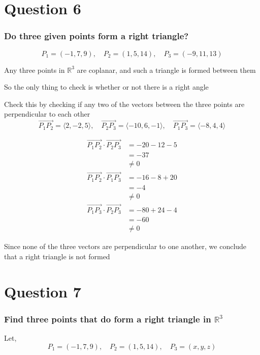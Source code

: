 \documentclass{article}
\begin{document}
\section*{Question 6}
\subsubsection*{Do three given points form a right triangle?}
\[
P_1 = (-1,7,9), \quad P_2 = (1,5,14),  \quad P_3 = (-9,11,13)
\]

Any three points in \(\mathbb{R}^3\) are coplanar, and such a triangle is formed between them

So the only thing to check is whether or not there is a right angle

Check this by checking if any two of the vectors between the three points are perpendicular to each other
\[
\overrightarrow{P_1P_2} = \langle 2,-2,5 \rangle, \quad \overrightarrow{P_2P_3} = \langle -10,6,-1 \rangle, 
\quad \overrightarrow{P_1P_3} = \langle -8,4,4 \rangle
\]

\begin{align*}
    \overrightarrow{P_1P_2} \cdot \overrightarrow{P_2P_3} &= -20-12-5 \\
    &= -37 \\
    &\neq 0
\end{align*}
\begin{align*}
    \overrightarrow{P_1P_2} \cdot \overrightarrow{P_1P_3} &= -16-8+20 \\
    &= -4 \\
    &\neq 0
\end{align*}
\begin{align*}
    \overrightarrow{P_1P_3} \cdot \overrightarrow{P_2P_3} &= -80 +24-4 \\
    &= -60 \\
    &\neq 0
\end{align*}

Since none of the three vectors are perpendicular to one another, we conclude that a right triangle is not formed

\section*{Question 7}
\subsubsection*{Find three points that do form a right triangle in \(\mathbb{R}^3\)}

Let,
\[
P_1 = (-1,7,9), \quad P_2 = (1,5,14),  \quad P_3 = (x,y,z)
\]
\end{document}
